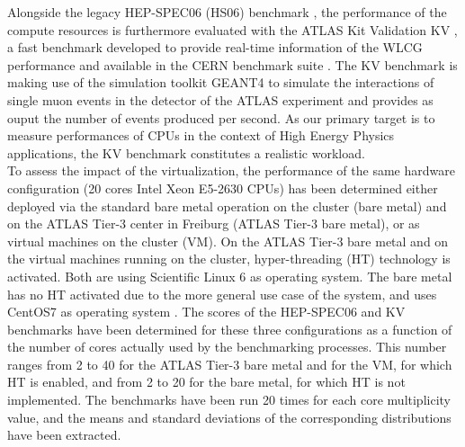 Alongside the legacy HEP-SPEC06 (HS06) benchmark \cite{Hepspec}, the performance of the compute resources is furthermore evaluated with the ATLAS Kit Validation
KV \cite{DeSalvo:2010zza}, a fast benchmark developed to provide real-time information of the WLCG performance and available in the CERN benchmark suite \cite{Alef:2017jyx}.
The KV benchmark is making use of the simulation toolkit GEANT4 \cite{Agostinelli:2002hh} to simulate the interactions of single muon events in the detector of the ATLAS experiment
and provides as ouput the number of events produced per second. As our primary target is to measure performances of CPUs in the context of High Energy Physics applications, the KV benchmark
constitutes a realistic workload. \\

To assess the impact of the virtualization, the performance of the same hardware configuration (20 cores Intel Xeon E5-2630 CPUs) has been determined either deployed via
the standard bare metal operation on the \NEMO cluster (\NEMO bare metal) and on the ATLAS Tier-3 center in Freiburg (ATLAS Tier-3 bare metal), or as virtual machines on the
\NEMO cluster (\NEMO VM). On the ATLAS Tier-3 bare metal and on the virtual machines running on the \NEMO cluster, hyper-threading (HT) technology is activated. Both are using Scientific
Linux 6 \cite{SL6} as operating system. The \NEMO bare metal has no HT activated due to the more general use case of the system, and uses CentOS7 as operating system \cite{CentOS7}. 
The scores of the HEP-SPEC06 and KV benchmarks have been determined for these three configurations as a function of the number of cores actually used by the benchmarking processes.
This number ranges from 2 to 40 for the ATLAS Tier-3 bare metal and for the \NEMO VM, for which HT is enabled, and from 2 to 20 for the \NEMO bare metal, for which HT is not implemented.
The benchmarks have been run 20 times for each core multiplicity value, and the means and standard deviations of the corresponding distributions have been extracted. \\

